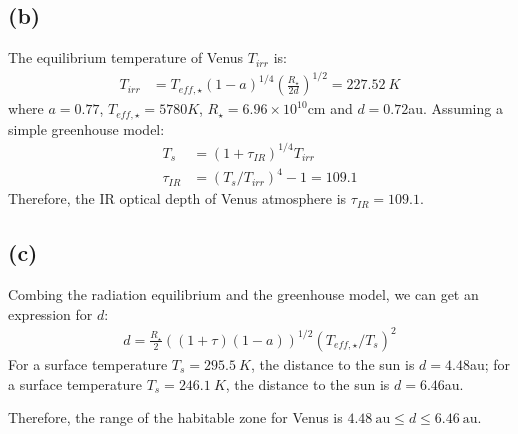 \documentclass[a4paper,12pt]{article}
\newcommand{\cm}{\mathrm{cm}}
\begin{document}
\subsection*{(b)}
The equilibrium temperature of Venus $T_{irr}$ is:
\begin{align*}
    T_{irr} &= T_{eff, \star} (1-a)^{1/4} (\frac{R_\star}{2d})^{1/2} = 227.52 \ K
\end{align*}
where $a=0.77$, $T_{eff, \star}=5780K$, $R_\star = 6.96 \times 10^{10} \cm$ and $d=0.72$au.
Assuming a simple greenhouse model:
\begin{align*}
    T_s &= (1+\tau_{IR})^{1/4} T_{irr} \\
    \tau_{IR} &= (T_s / T_{irr})^4 - 1 = 109.1
\end{align*}
Therefore, the IR optical depth of Venus atmosphere is $\tau_{IR} = 109.1$.

\subsection*{(c)}
Combing the radiation equilibrium and the greenhouse model, we can 
get an expression for $d$:
\begin{align*}
    d = \frac{R_\star}{2} ((1+\tau)(1-a))^{1/2} (T_{eff, \star} / T_s)^2
\end{align*}
For a surface temperature $T_s = 295.5 \ K$, the distance to the sun is $d=4.48$au;
for a surface temperature $T_s = 246.1 \ K$, the distance to the sun is $d=6.46$au.

Therefore, the range of the habitable zone for Venus is $4.48 \ \text{au} \leq d \leq 6.46 \ \text{au}$.
\end{document}
